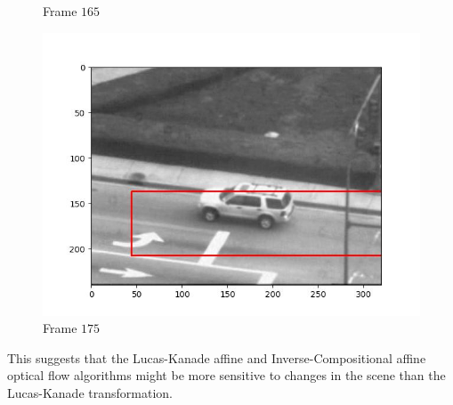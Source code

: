 \begin{figure}[H]
\begin{minipage}{.45\textwidth}
    \caption{Frame $165$}
  \end{minipage}
  \begin{minipage}{.45\textwidth}
    \centering
    \includegraphics[width=.8\textwidth]{./figures/lk_affine/car2/frame000175.jpg}
    \caption{Frame $175$}
  \end{minipage}
\end{figure}

This suggests that the Lucas-Kanade affine and Inverse-Compositional affine optical flow
algorithms might be more sensitive to changes in the scene than the Lucas-Kanade transformation.
